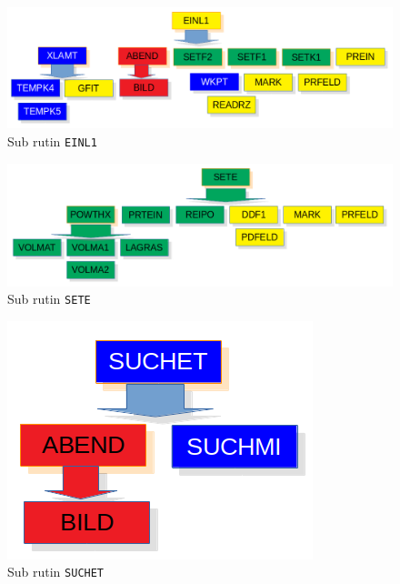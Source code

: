 \documentclass[a4paper,11pt]{report}
\begin{document}
\begin{figure}[h!]
  \begin{center}
    \includegraphics[scale=.5]{../einl1.png}
    \caption{Sub rutin \texttt{EINL1}}
    \label{fig:einl1}
  \end{center}
\end{figure}

\begin{figure}[h!]
  \begin{center}
    \includegraphics[scale=.5]{../sete.png}
    \caption{Sub rutin \texttt{SETE}}
    \label{fig:sete}
  \end{center}
\end{figure}

\begin{figure}[h!]
  \begin{center}
    \includegraphics[scale=.5]{../suchet.png}
    \caption{Sub rutin \texttt{SUCHET}}
    \label{fig:suchet}
  \end{center}
\end{figure}
\end{document}
